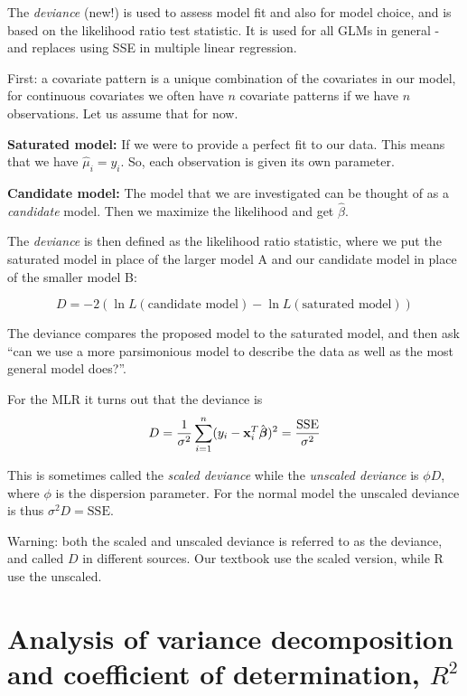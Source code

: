 \documentclass[
]{article}
\begin{document}
The \emph{deviance} (new!) is used to assess model fit and also for
model choice, and is based on the likelihood ratio test statistic. It is
used for all GLMs in general - and replaces using SSE in multiple linear
regression.

First: a covariate pattern is a unique combination of the covariates in
our model, for continuous covariates we often have \(n\) covariate
patterns if we have \(n\) observations. Let us assume that for now.

\textbf{Saturated model:} If we were to provide a perfect fit to our
data. This means that we have \(\hat{\mu}_i=y_i\). So, each observation
is given its own parameter.

\textbf{Candidate model:} The model that we are investigated can be
thought of as a \emph{candidate} model. Then we maximize the likelihood
and get \(\hat{\beta}\).

The \emph{deviance} is then defined as the likelihood ratio statistic,
where we put the saturated model in place of the larger model A and our
candidate model in place of the smaller model B:

\[D=-2(\ln L(\text{candidate model})-\ln L(\text{saturated model}))\]

The deviance compares the proposed model to the saturated model, and
then ask ``can we use a more parsimonious model to describe the data as
well as the most general model does?''.

For the MLR it turns out that the deviance is
\[D=\frac{1}{\sigma^2} \sum_{i=1}^n (y_i-{\bf x}_i^T \hat{\boldsymbol\beta})^2=\frac{\text{SSE}}{\sigma^2}\]

This is sometimes called the \emph{scaled deviance} while the
\emph{unscaled deviance} is \(\phi D\), where \(\phi\) is the dispersion
parameter. For the normal model the unscaled deviance is thus
\(\sigma^2 D=\text{SSE}\).

Warning: both the scaled and unscaled deviance is referred to as the
deviance, and called \(D\) in different sources. Our textbook use the
scaled version, while R use the unscaled.

\hypertarget{analysis-of-variance-decomposition-and-coefficient-of-determination-r2}{%
\section{\texorpdfstring{Analysis of variance decomposition and
coefficient of determination,
\(R^2\)}{Analysis of variance decomposition and coefficient of determination, R\^{}2}}\label{analysis-of-variance-decomposition-and-coefficient-of-determination-r2}}
\end{document}

